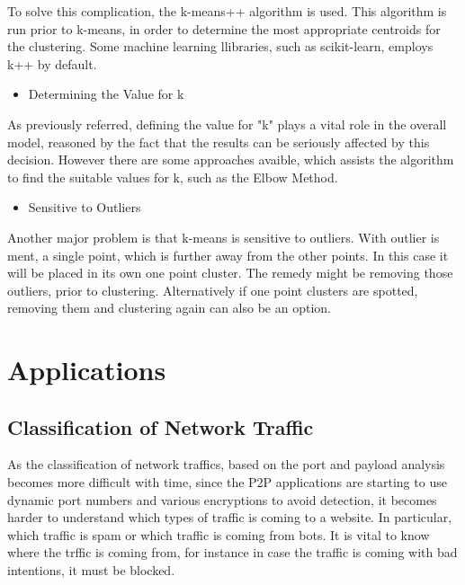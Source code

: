 \documentclass[conference]{IEEEtran}
\begin{document}
To solve this complication, the k-means++ algorithm is used. This algorithm is run prior to k-means, in order to determine the most appropriate centroids for the clustering. Some machine learning llibraries, such as scikit-learn, employs k++ by default.\\


\begin{itemize}
  \item Determining the Value for k
\end{itemize}
As previously referred, defining the value for "k" plays a vital role in the overall model, reasoned by the fact that the results can be seriously affected by this decision. However there are some approaches avaible, which assists the algorithm to find the suitable values for k, such as the Elbow Method.\\

\begin{itemize}
  \item Sensitive to Outliers
\end{itemize}

Another major problem is that k-means is sensitive to outliers. With outlier is ment, a single point, which is further away from the other points. In this case it will be placed in its own one point cluster. The remedy might be removing those outliers, prior to clustering. Alternatively if one point clusters are spotted, removing them and clustering again can also be an option.


\section{Applications}

\subsection{Classification of Network Traffic}

As the classification of network traffics, based on the port and payload analysis becomes more difficult with time, since the P2P applications are starting to use dynamic port numbers and various encryptions to avoid detection, it becomes harder to understand which types of traffic is coming to a website. In particular, which traffic is spam or which traffic is coming from bots. It is vital to know where the trffic is coming from, for instance in case the traffic is coming with bad intentions, it must be blocked.\\
\end{document}
